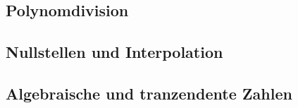 \documentclass[../Analysis1_script.tex]{subfiles}
\begin{document}
\subsection{Polynomdivision}

\subsection{Nullstellen und Interpolation}

\subsection{Algebraische und tranzendente Zahlen}
\end{document}
